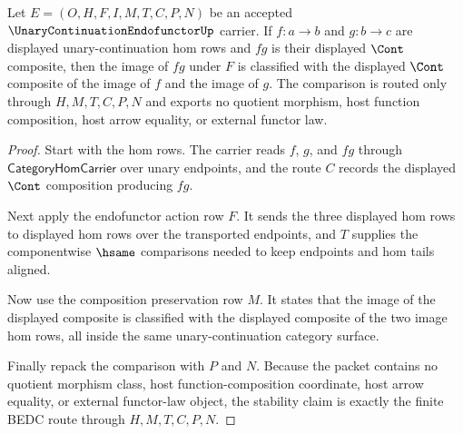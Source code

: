 \begin{theorem}
\label{thm:unary-continuation-endofunctor-composition-stability}
Let $E=(O,H,F,I,M,T,C,P,N)$ be an accepted
$\UnaryContinuationEndofunctorUp$ carrier. If $f:a\to b$ and $g:b\to c$ are
displayed unary-continuation hom rows and $fg$ is their displayed $\Cont$
composite, then the image of $fg$ under $F$ is classified with the displayed
$\Cont$ composite of the image of $f$ and the image of $g$. The comparison is
routed only through $H,M,T,C,P,N$ and exports no quotient morphism, host
function composition, host arrow equality, or external functor law.
\end{theorem}
\begin{proof}
Start with the hom rows. The carrier reads $f$, $g$, and $fg$ through
$\mathsf{CategoryHomCarrier}$ over unary endpoints, and the route $C$ records
the displayed $\Cont$ composition producing $fg$.

Next apply the endofunctor action row $F$. It sends the three displayed hom
rows to displayed hom rows over the transported endpoints, and $T$ supplies
the componentwise $\hsame$ comparisons needed to keep endpoints and hom tails
aligned.

Now use the composition preservation row $M$. It states that the image of the
displayed composite is classified with the displayed composite of the two
image hom rows, all inside the same unary-continuation category surface.

Finally repack the comparison with $P$ and $N$. Because the packet contains no
quotient morphism class, host function-composition coordinate, host arrow
equality, or external functor-law object, the stability claim is exactly the
finite BEDC route through $H,M,T,C,P,N$.
\end{proof}


\begin{closurestatus}{\UnaryContinuationEndofunctorUp}
  \theoryclosure{\seedClosure}
  \formalstatus{\unformalizedV}
\end{closurestatus}

